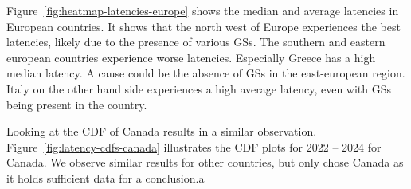 Figure~\ref{fig:heatmap-latencies-europe} shows the median and average
latencies in European countries. It shows that the north west of Europe
experiences the best latencies, likely due to the presence of various \ac{GS}s.
The southern and eastern european countries experience worse latencies.
Especially Greece has a high median latency. A cause could be the absence of
\ac{GS}s in the east-european region. Italy on the other hand side experiences
a high average latency, even with \ac{GS}s being present in the country.

Looking at the CDF of Canada results in a similar observation.
Figure~\ref{fig:latency-cdfs-canada} illustrates the CDF plots for 2022 -- 2024
for Canada. We observe similar results for other countries, but only chose
Canada as it holds sufficient data for a conclusion.a


